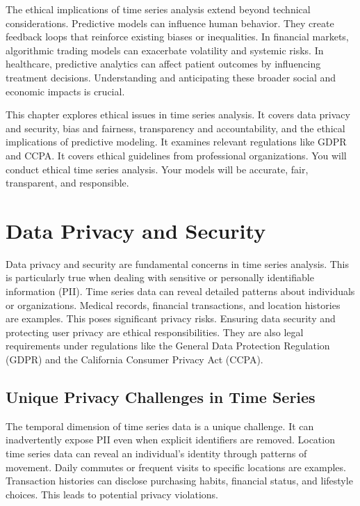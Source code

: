 The ethical implications of time series analysis extend beyond technical considerations. Predictive models can influence human behavior. They create feedback loops that reinforce existing biases or inequalities. In financial markets, algorithmic trading models can exacerbate volatility and systemic risks. In healthcare, predictive analytics can affect patient outcomes by influencing treatment decisions. Understanding and anticipating these broader social and economic impacts is crucial.

This chapter explores ethical issues in time series analysis. It covers data privacy and security, bias and fairness, transparency and accountability, and the ethical implications of predictive modeling. It examines relevant regulations like GDPR and CCPA. It covers ethical guidelines from professional organizations. You will conduct ethical time series analysis. Your models will be accurate, fair, transparent, and responsible.



\section{Data Privacy and Security}

Data privacy and security are fundamental concerns in time series analysis. This is particularly true when dealing with sensitive or personally identifiable information (PII). Time series data can reveal detailed patterns about individuals or organizations. Medical records, financial transactions, and location histories are examples. This poses significant privacy risks. Ensuring data security and protecting user privacy are ethical responsibilities. They are also legal requirements under regulations like the General Data Protection Regulation (GDPR) and the California Consumer Privacy Act (CCPA).

\subsection{Unique Privacy Challenges in Time Series}

The temporal dimension of time series data is a unique challenge. It can inadvertently expose PII even when explicit identifiers are removed. Location time series data can reveal an individual's identity through patterns of movement. Daily commutes or frequent visits to specific locations are examples. Transaction histories can disclose purchasing habits, financial status, and lifestyle choices. This leads to potential privacy violations.

